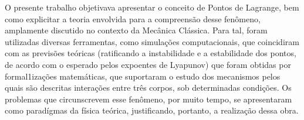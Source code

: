 O presente trabalho objetivava apresentar o conceito de Pontos de Lagrange, bem como explicitar a teoria envolvida para a compreensão desse fenômeno, amplamente discutido no contexto da Mecânica Clássica. Para tal, foram utilizadas diversas ferramentas, como simulações computacionais, que coincidiram com as previsões teóricas (ratificando a instabilidade e a estabilidade dos pontos, de acordo com o esperado pelos expoentes de Lyapunov) que foram obtidas por formal1izações matemáticas, que suportaram o estudo dos mecanismos pelos quais são descritas interações entre três corpos, sob determinadas condições. Os problemas que circunscrevem esse fenômeno, por muito tempo, se apresentaram como  paradígmas da física teórica, justificando, portanto, a realização dessa obra.
